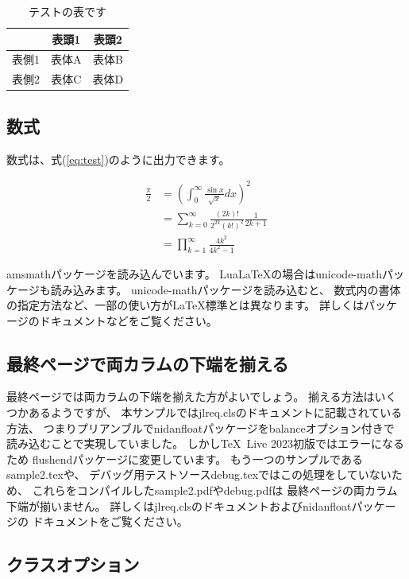 \documentclass{FITpaper}
\begin{document}
\begin{table}[htbp]
  \centering
  \begin{tabular}{c|cc}
    & 表頭1 & 表頭2 \\
    \hline
    表側1 & 表体A & 表体B \\
    表側2 & 表体C & 表体D \\
  \end{tabular}
  \caption{テストの表です}
  \label{tbl:test}
\end{table}

\subsection{数式}

数式は、式(\ref{eq:test})のように出力できます。

\begin{align}
  \frac{\pi}{2} &=
  \left( \int_{0}^{\infty} \frac{\sin x}{\sqrt{x}} dx \right)^2 \nonumber \\
  &= \sum_{k=0}^{\infty} \frac{(2k)!}{2^{2k}(k!)^2} \frac{1}{2k+1} \nonumber \\
  &= \prod_{k=1}^{\infty} \frac{4k^2}{4k^2 - 1}
  \label{eq:test}
\end{align}

amsmathパッケージを読み込んでいます。
Lua\LaTeX の場合はunicode-mathパッケージも読み込みます。
unicode-mathパッケージを読み込むと、
数式内の書体の指定方法など、一部の使い方が\LaTeX 標準とは異なります。
詳しくはパッケージのドキュメントなどをご覧ください。

\subsection{最終ページで両カラムの下端を揃える}

最終ページでは両カラムの下端を揃えた方がよいでしょう。
揃える方法はいくつかあるようですが、
本サンプルではjlreq.clsのドキュメントに記載されている方法、
つまりプリアンブルでnidanfloatパッケージをbalanceオプション付きで
読み込むことで実現していました。
しかし\TeX~Live 2023初版ではエラー\cite{nidanfloat-issue}になるため
flushendパッケージに変更しています。
もう一つのサンプルであるsample2.texや、
デバッグ用テストソースdebug.texではこの処理をしていないため、
これらをコンパイルしたsample2.pdfやdebug.pdfは
最終ページの両カラム下端が揃いません。
詳しくはjlreq.clsのドキュメントおよびnidanfloatパッケージの
ドキュメントをご覧ください。

\subsection{クラスオプション}
\end{document}
